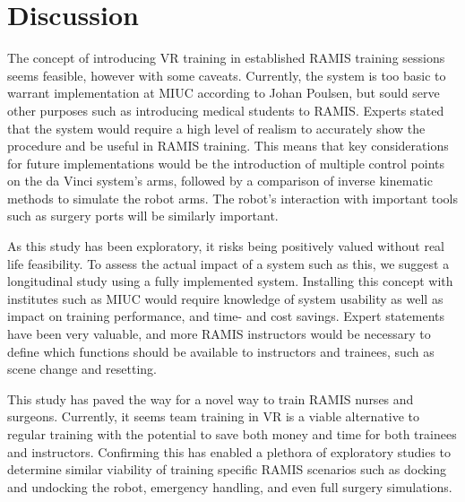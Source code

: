 \section{Discussion}

The concept of introducing VR training in established RAMIS training sessions seems feasible, however with some caveats. Currently, the system is too basic to warrant implementation at MIUC according to Johan Poulsen, but sould serve other purposes such as introducing medical students to RAMIS. Experts stated that the system would require a high level of realism to accurately show the procedure and be useful in RAMIS training. This means that key considerations for future implementations would be the introduction of multiple control points on the da Vinci system's arms, followed by a comparison of inverse kinematic methods to simulate the robot arms. The robot's interaction with important tools such as surgery ports will be similarly important.

As this study has been exploratory, it risks being positively valued without real life feasibility. To assess the actual impact of a system such as this, we suggest a longitudinal study using a fully implemented system. Installing this concept with institutes such as MIUC would require knowledge of system usability as well as impact on training performance, and time- and cost savings. Expert statements have been very valuable, and more RAMIS instructors would be necessary to define which functions should be available to instructors and trainees, such as scene change and resetting. 

This study has paved the way for a novel way to train RAMIS nurses and surgeons. Currently, it seems team training in VR is a viable alternative to regular training with the potential to save both money and time for both trainees and instructors. Confirming this has enabled a plethora of exploratory studies to determine similar viability of training specific RAMIS scenarios such as docking and undocking the robot, emergency handling, and even full surgery simulations.



